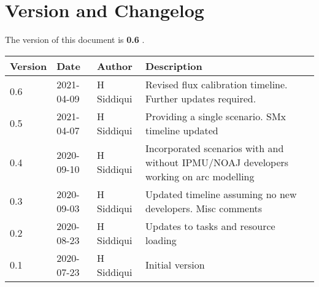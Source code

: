 \section{Version and Changelog}

The version of this document is {\bf 0.6} .

\begin{table}[H]
    \begin{tabular}{|l|l|l|p{10cm}| }
    \hline
    {\bf Version} & {\bf Date} & {\bf Author} & {\bf Description} \\ \hline
    0.6 & 2021-04-09 & H Siddiqui & Revised flux calibration timeline. Further updates required.\\ \hline
    0.5 & 2021-04-07 & H Siddiqui & Providing a single scenario. SMx timeline updated\\ \hline
    0.4 & 2020-09-10 & H Siddiqui & Incorporated scenarios with and without IPMU/NOAJ developers working on arc modelling\\ \hline
    0.3 & 2020-09-03 & H Siddiqui & Updated timeline assuming no new developers. Misc comments\\ \hline
    0.2 & 2020-08-23 & H Siddiqui & Updates to tasks and resource loading \\ \hline
    0.1 & 2020-07-23 & H Siddiqui & Initial version \\ \hline
    \end{tabular}
\end{table}
